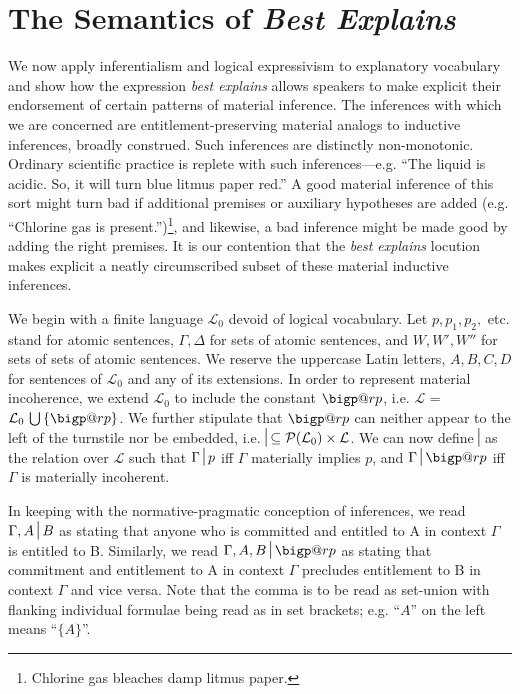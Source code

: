 \documentclass{article}
\makeatletter
\newcommand{\nc}{\turnstile{s}{w}{}{}{n}}
\newcommand{\bigperp}{%
  \mathop{\mathpalette\bigp@rp\relax}%
  \displaylimits
}
\newcommand{\bigp@rp}[2]{%
  \vcenter{
    \m@th\hbox{\scalebox{\ifx#1\displaystyle2.1\else1.5\fi}{$#1\perp$}}
  }%
}
\makeatother
\begin{document}
\section{The Semantics of \textit{Best Explains}}
We now apply inferentialism and logical expressivism to explanatory vocabulary and show how the expression \textit{best explains} allows speakers to make explicit their endorsement of certain patterns of material inference. The inferences with which we are concerned are entitlement-preserving material analogs to inductive inferences, broadly construed. Such inferences are distinctly non-monotonic. Ordinary scientific practice is replete with such inferences---e.g. ``The liquid is acidic. So, it will turn blue litmus paper red.'' A good material inference of this sort might turn bad if additional premises or auxiliary hypotheses are added (e.g. ``Chlorine gas is present.'')\footnote{Chlorine gas bleaches damp litmus paper.}, and likewise, a bad inference might be made good by adding the right premises. It is our contention that the \textit{best explains} locution makes explicit a neatly circumscribed subset of these material inductive inferences. 

We begin with a finite language $ \mathcal{L}_{0} $ devoid of logical vocabulary. Let $ p, p_1, p_2, $ etc. stand for atomic sentences, $ \Gamma, \Delta $ for sets of atomic sentences, and $ W, W',W'' $ for sets of sets of atomic sentences. We reserve the uppercase Latin letters, $ A, B, C, D $ for sentences of $ \mathcal{L}_0 $ and any of its extensions. In order to represent material incoherence, we extend $ \mathcal{L}_0 $ to include the constant $ \bigperp $, i.e. $ \mathcal{L} $ = $ \mathcal{L}_0 \,\bigcup \,\{\bigperp\}$. We further stipulate that $ \bigperp $ can neither appear to the left of the turnstile nor be embedded, i.e. $ {\nc} \subseteq \mathcal{P}(\mathcal{L}_0) \times \mathcal{L} $. We can now define $ \nc $ as the relation over $ \mathcal{L} $ such that $  \Gamma\nc p $ iff  $\Gamma$ materially implies $ p $, and $\Gamma\nc \bigperp $ iff $ \Gamma $ is materially incoherent. 

In keeping with the normative-pragmatic conception of inferences, we read  $ \Gamma, A \nc B  $ as stating that anyone who is committed and entitled to A in context $ \Gamma $ is entitled to B. Similarly, we read  $\Gamma, A, B \nc \bigperp $ as stating that commitment and entitlement to A in context $ \Gamma $ precludes entitlement to B in context $ \Gamma $ and vice versa. Note that the comma is to be read as set-union with flanking individual formulae being read as in set brackets; e.g. ``$ A $'' on the left means ``$ \{ A\} $''. 
\end{document}
